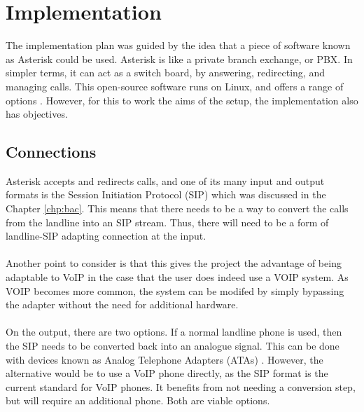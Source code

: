 \documentclass[main.tex]{subfiles}
\begin{document}
\section{Implementation}
The implementation plan was guided by the idea that a piece of software known as Asterisk could be used. Asterisk is like a private branch exchange, or PBX. In simpler terms, it can act as a switch board, by answering, redirecting, and managing calls. This open-source software runs on Linux, and offers a range of options \cite{asterisk}. However, for this to work the aims of the setup, the implementation also has objectives.

\subsection{Connections}
Asterisk accepts and redirects calls, and one of its many input and output formats is the Session Initiation Protocol (SIP) \cite{sip} which was discussed in the Chapter \ref{chp:bac}. This means that there needs to be a way to convert the calls from the landline into an SIP stream. Thus, there will need to be a form of landline-SIP adapting connection at the input.
\\\\
Another point to consider is that this gives the project the advantage of being adaptable to VoIP in the case that the user does indeed use a VOIP system. As VOIP becomes more common, the system can be modifed by simply bypassing the adapter without the need for additional hardware.
\\\\
On the output, there are two options. If a normal landline phone is used, then the SIP needs to be converted back into an analogue signal. This can be done with devices known as Analog Telephone Adapters (ATAs) \cite{ata}. However, the alternative would be to use a VoIP phone directly, as the SIP format is the current standard for VoIP phones. It benefits from not needing a conversion step, but will require an additional phone. Both are viable options.
\end{document}
